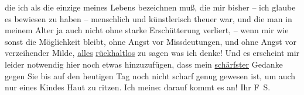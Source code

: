 \begin{ledgroupsized}[t]{13cm}
               die ich als die einzige meines Lebens bezeichnen muß, die mir bisher – ich glaube es
               bewiesen zu haben – menschlich und künstlerisch theuer war, und die man in meinem
               Alter ja auch nicht ohne starke Erschütterung verliert, – wenn mir wie sonst die
               Möglichkeit bleibt, ohne Angst vor Missdeutungen, und ohne Angst vor verzeihender
               Milde, \uline{alles}{ }\uline{rückhaltlos} zu sagen was ich denke! Und es erscheint
               mir leider notwendig hier noch etwas hinzuzufügen, dass mein \uline{schärfster} Gedanke \introOben{}gegen Sie\introOben{} bis auf den
               heutigen Tag noch nicht scharf genug gewesen ist, um auch nur eines Kindes Haut zu
               ritzen. Ich meine: darauf kommt es an!\pend
           \pstart Ihr \spacefill\mbox{F S.}\pend{}
         
         \endnumbering{}\end{ledgroupsized}  \newcommand{\dateiname}{L03355}\newcommand{\titel}{Felix Salten an Arthur Schnitzler, [11. 11. 1903]}\newcommand{\editorInnen}{Martin Anton Müller und Laura Untner}
      